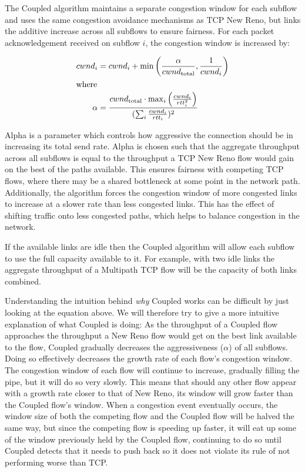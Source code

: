 The Coupled algorithm maintains a separate congestion window for each subflow
and uses the same congestion avoidance mechanisms as TCP New Reno, but links the
additive increase across all subflows to ensure fairness. For each packet
acknowledgement received on subflow $i$, the congestion window is increased by:

\begin{align*}
  cwnd_i &= cwnd_i +
    \min\left(\frac{\alpha}{cwnd_\text{total}}, \frac{1}{cwnd_i}\right) \\
  \intertext{where}
  \alpha &=
    \frac{cwnd_\text{total} \cdot \max_i\left(\frac{cwnd_i}{rtt_i^2}\right)}
         {(\sum_i \frac{cwnd_i}{rtt_i})^2}
\end{align*}

Alpha is a parameter which controls how aggressive the connection should be in
increasing its total send rate. Alpha is chosen such that the aggregate
throughput across all subflows is equal to the throughput a TCP New Reno flow
would gain on the best of the paths available. This ensures fairness with
competing TCP flows, where there may be a shared bottleneck at some point in the
network path. Additionally, the algorithm forces the congestion window of more
congested links to increase at a slower rate than less congested links. This has
the effect of shifting traffic onto less congested paths, which helps to balance
congestion in the network.

If the available links are idle then the Coupled algorithm will allow each
subflow to use the full capacity available to it. For example, with two idle
links the aggregate throughput of a Multipath TCP flow will be the capacity of
both links combined.

Understanding the intuition behind \textit{why} Coupled works can be difficult
by just looking at the equation above. We will therefore try to give a more
intuitive explanation of what Coupled is doing: As the throughput of a Coupled
flow approaches the throughput a New Reno flow would get on the best link
available to the flow, Coupled gradually decreases the aggressiveness ($\alpha$)
of all subflows. Doing so effectively decreases the growth rate of each flow's
congestion window. The congestion window of each flow will continue to increase,
gradually filling the pipe, but it will do so very slowly. This means that
should any other flow appear with a growth rate closer to that of New Reno, its
window will grow faster than the Coupled flow's window. When a congestion event
eventually occurs, the window size of both the competing flow and the Coupled
flow will be halved the same way, but since the competing flow is speeding up
faster, it will eat up some of the window previously held by the Coupled flow,
continuing to do so until Coupled detects that it needs to push back so it
does not violate its rule of not performing worse than TCP.

